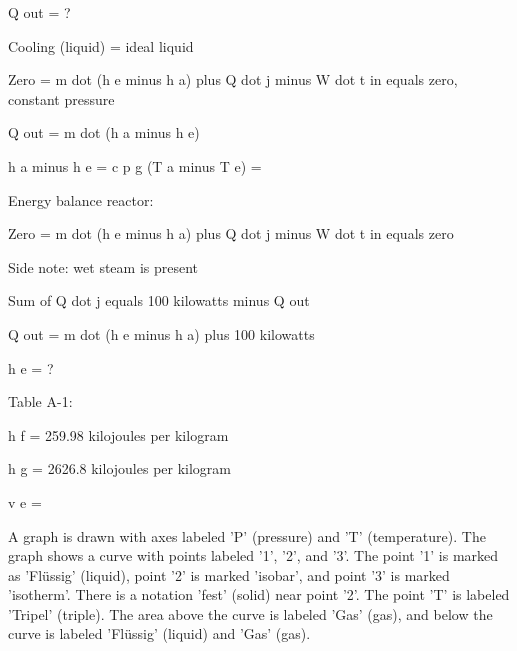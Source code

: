 Q out = ?

Cooling (liquid) = ideal liquid

Zero = m dot (h e minus h a) plus Q dot j minus W dot t in equals zero, constant pressure

Q out = m dot (h a minus h e)

h a minus h e = c p g (T a minus T e)
=

Energy balance reactor:

Zero = m dot (h e minus h a) plus Q dot j minus W dot t in equals zero

Side note: wet steam is present

Sum of Q dot j equals 100 kilowatts minus Q out

Q out = m dot (h e minus h a) plus 100 kilowatts

h e = ?

Table A-1:

h f = 259.98 kilojoules per kilogram

h g = 2626.8 kilojoules per kilogram

v e =

A graph is drawn with axes labeled 'P' (pressure) and 'T' (temperature). The graph shows a curve with points labeled '1', '2', and '3'. The point '1' is marked as 'Flüssig' (liquid), point '2' is marked 'isobar', and point '3' is marked 'isotherm'. There is a notation 'fest' (solid) near point '2'. The point 'T' is labeled 'Tripel' (triple). The area above the curve is labeled 'Gas' (gas), and below the curve is labeled 'Flüssig' (liquid) and 'Gas' (gas).